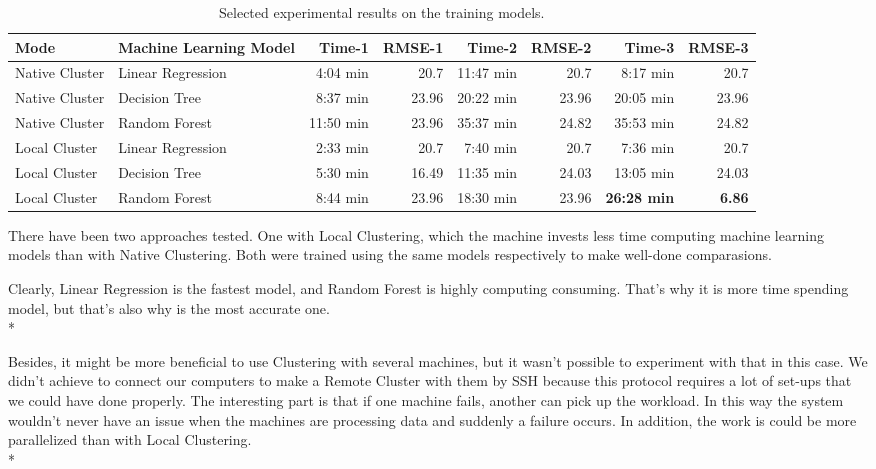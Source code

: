 \begin{table}[H]
	\centering
	\begin{tabular}{llrrrrrr}
		Mode & Machine Learning Model & Time-1 & RMSE-1 & Time-2 & RMSE-2 & Time-3 & RMSE-3
		\\ \hline \hline
		Native Cluster  & Linear Regression   &    4:04 min  &   20.7  &  11:47 min & 20.7 & 8:17 min & 20.7 \\   
		Native Cluster  & Decision Tree   &    8:37 min  &   23.96  &  20:22 min  &  23.96  & 20:05 min &  23.96\\   
		Native Cluster  & Random Forest   &   11:50 min &   23.96  &  35:37 min  & 24.82  & 35:53 min & 24.82 \\  \hline
		Local Cluster   & Linear Regression   &   2:33 min &   20.7  &  7:40 min  & 20.7 & 7:36 min  & 20.7   \\ 
		Local Cluster   & Decision Tree   &   5:30 min &   16.49  & 11:35 min & 24.03 & 13:05 min & 24.03  \\   
		Local Cluster   & Random Forest   &   8:44 min &   23.96  & 18:30 min & 23.96 & \textbf{26:28 min} & \textbf{6.86}  \\
		\hline \hline
	\end{tabular}
	\caption{Selected experimental results on the training models.}
	\label{tab:results}
\end{table}

There have been two approaches tested. One with Local Clustering, which the machine invests less time computing machine learning models than with Native Clustering. Both were trained using the same models respectively to make well-done comparasions.

Clearly, Linear Regression is the fastest model, and Random Forest is highly computing consuming. That's why it is more time spending model, but that's also why is the most accurate one.\\*

Besides, it might be more beneficial to use Clustering with several machines, but it wasn't possible to experiment with that in this case. We didn't achieve to connect our computers to make a Remote Cluster with them by SSH because this protocol requires a lot of set-ups that we could have done properly. The interesting part is that if one machine fails, another can pick up the workload. In this way the system wouldn’t never have an issue when the machines are processing data and suddenly a failure occurs. In addition, the work is could be more parallelized than with Local Clustering.\\*

